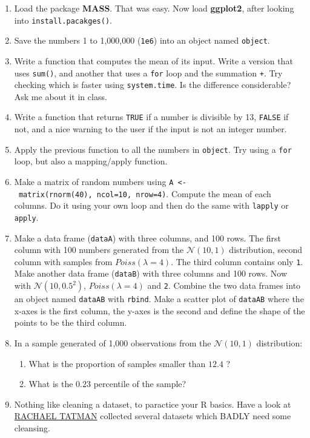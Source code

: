 \documentclass[]{book}
\providecommand{\tightlist}{%
  \setlength{\itemsep}{0pt}\setlength{\parskip}{0pt}}
\theoremstyle{definition}
\theoremstyle{definition}
\theoremstyle{definition}
\theoremstyle{remark}
\begin{document}
\begin{enumerate}
\def\labelenumi{\arabic{enumi}.}
\item
  Load the package \textbf{MASS}. That was easy. Now load
  \textbf{ggplot2}, after looking into \texttt{install.pacakges()}.
\item
  Save the numbers 1 to 1,000,000 (\texttt{1e6}) into an object named
  \texttt{object}.
\item
  Write a function that computes the mean of its input. Write a version
  that uses \texttt{sum()}, and another that uses a \texttt{for} loop
  and the summation \texttt{+}. Try checking which is faster using
  \texttt{system.time}. Is the difference considerable? Ask me about it
  in class.
\item
  Write a function that returns \texttt{TRUE} if a number is divisible
  by 13, \texttt{FALSE} if not, and a nice warning to the user if the
  input is not an integer number.
\item
  Apply the previous function to all the numbers in \texttt{object}. Try
  using a \texttt{for} loop, but also a mapping/apply function.
\item
  Make a matrix of random numbers using
  \texttt{A\ \textless{}-\ matrix(rnorm(40),\ ncol=10,\ nrow=4)}.
  Compute the mean of each columns. Do it using your own loop and then
  do the same with \texttt{lapply} or \texttt{apply}.
\item
  Make a data frame (\texttt{dataA}) with three columns, and 100 rows.
  The first column with 100 numbers generated from the
  \(\mathcal{N}(10,1)\) distribution, second column with samples from
  \(Poiss(\lambda=4)\). The third column contains only \texttt{1}.\\
  Make another data frame (\texttt{dataB}) with three columns and 100
  rows. Now with \(\mathcal{N}(10,0.5^2)\), \(Poiss(\lambda=4)\) and
  \texttt{2}. Combine the two data frames into an object named
  \texttt{dataAB} with \texttt{rbind}. Make a scatter plot of
  \texttt{dataAB} where the x-axes is the first column, the y-axes is
  the second and define the shape of the points to be the third column.
\item
  In a sample generated of 1,000 observations from the
  \(\mathcal{N}(10,1)\) distribution:

  \begin{enumerate}
  \def\labelenumii{\arabic{enumii}.}
  \tightlist
  \item
    What is the proportion of samples smaller than \(12.4\) ?
  \item
    What is the \(0.23\) percentile of the sample?
  \end{enumerate}
\item
  Nothing like cleaning a dataset, to paractice your R basics. Have a
  look at
  \href{https://makingnoiseandhearingthings.com/2018/04/19/datasets-for-data-cleaning-practice/}{RACHAEL
  TATMAN} collected several datasets which BADLY need some cleansing.
\end{enumerate}
\end{document}
